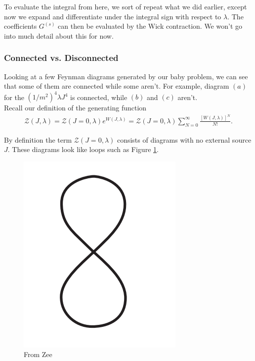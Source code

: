 \documentclass{book}
\theoremstyle{definition}
\newcommand{\f}[2]{\frac{#1}{#2}}
\newcommand{\Z}{\mathcal{Z}}
\begin{document}
To evaluate the integral from here, we sort of repeat what we did earlier, except now we expand and differentiate under the integral sign with respect to $\lambda$. The coefficients $G^{(s)}$ can then be evaluated by the Wick contraction. We won't go into much detail about this for now. 












\subsubsection{Connected vs. Disconnected}

Looking at a few Feynman diagrams generated by our baby problem, we can see that some of them are connected while some aren't. For example, diagram $(a)$ for the $(1/m^2)^4\lambda J^4$ is connected, while $(b)$ and $(c)$ aren't. \\


Recall our definition of the generating function
\begin{align}
\Z(J, \lambda) = \Z(J=0, \lambda)e^{W(J,\lambda)} = \Z(J=0, \lambda)\sum^\infty_{N=0}\f{[W(J,\lambda)]^N}{N!}.
\end{align}



By definition the term $\Z(J=0, \lambda)$ consists of diagrams with no external source $J$. These diagrams look like loops such as Figure \ref{fig:loops}.

\begin{figure}[!htb]
	\centering
	\includegraphics[scale=0.5]{feynman-diagram-4}
	\caption{From Zee}
	\label{fig:loops}
\end{figure}
\end{document}
